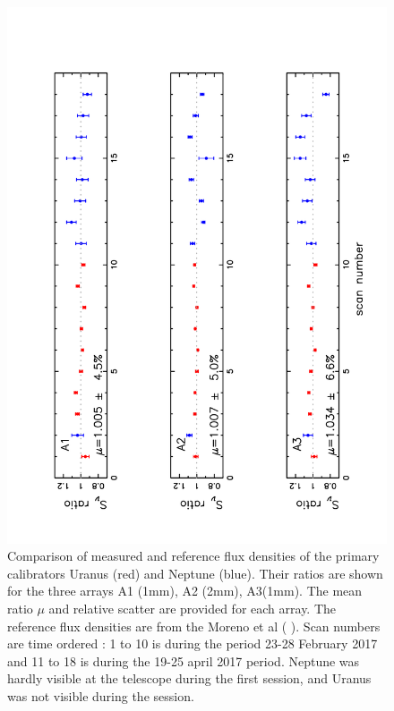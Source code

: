 \documentclass[]{aa} %
\begin{document}
\begin{figure}[h]
   \centering
    \includegraphics[angle=270,width=1.0\linewidth]{Ura_Nept_r9_10.pdf}     
    \caption{Comparison of  measured and reference flux densities of the primary calibrators Uranus (red) and Neptune (blue).
       Their ratios are shown for the three arrays A1 (1mm), A2 (2mm), A3(1mm).
      The mean ratio $\mu$ and relative scatter are provided for each array. The reference flux densities are from the Moreno et al ( ). 
      Scan numbers are time ordered : 1 to 10 is during the period 23-28 February 2017 and 11 to 18
      is during the  19-25 april 2017 period. Neptune was hardly visible at the telescope during the first session,
      and Uranus was not visible during the session.}
         \label{fig:calibaccuracy}
\end{figure}
\end{document}
